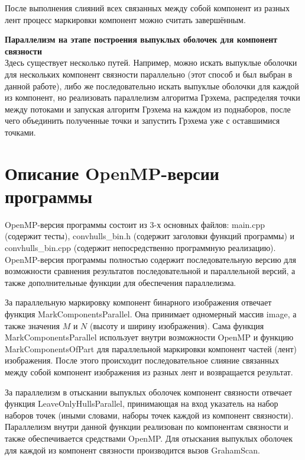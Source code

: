 \documentclass[14pt, russian]{extarticle}
\begin{document}
	После выполнения слияний всех связанных между собой компонент из разных лент процесс маркировки компонент можно считать завершённым.
	
	
	\noindent\textbf{Параллелизм на этапе построения выпуклых оболочек для компонент связности}\\
	\indent Здесь существует несколько путей. Например, можно искать выпуклые оболочки для нескольких компонент связности параллельно (этот способ и был выбран в данной работе), либо же последовательно искать выпуклые оболочки для каждой из компонент, но реализовать параллелизм алгоритма Грэхема, распределяя точки между потоками и запуская алгоритм Грэхема на каждом из поднаборов, после чего объединить полученные точки и запустить Грэхема уже с оставшимися точками.\\
	\newpage
	
	\section{Описание OpenMP-версии программы}
	
	OpenMP-версия программы состоит из 3-х основных файлов: main.cpp (содержит тесты), convhulls\_bin.h (содержит заголовки функций программы) и convhulls\_bin.cpp (содержит непосредственно программную реализацию).\\ \indent OpenMP-версия программы полностью содержит последовательную версию для возможности сравнения результатов последовательной и параллельной версий, а также дополнительные функции для обеспечения параллелизма.
	
	За параллельную маркировку компонент бинарного изображения отвечает функция MarkComponentsParallel. Она принимает одномерный массив image, а также значения $ M $ и $ N $ (высоту и ширину изображения). Сама функция MarkComponentsParallel использует внутри возможности OpenMP и функцию MarkComponentsOfPart для параллельной маркировки компонент частей (лент) изображения. После этого происходит последовательное слияние связанных между собой компонент изображения из разных лент и возвращается результат.
	
	За параллелизм в отыскании выпуклых оболочек компонент связности отвечает функция LeaveOnlyHullsParallel, принимающая на вход указатель на набор наборов точек (иными словами, наборы точек каждой из компонент связности). Параллелизм внутри данной функции реализован по компонентам связности и также обеспечивается средствами OpenMP. Для отыскания выпуклых оболочек для каждой из компонент связности производится вызов GrahamScan.
	\newpage
	
\end{document}

